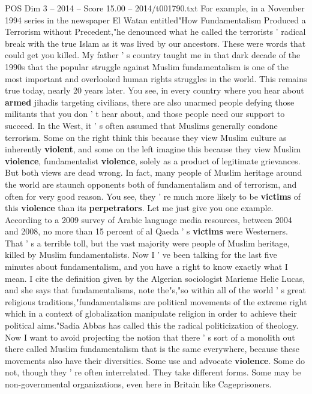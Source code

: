 \begin{textsample}{POS Dim 3 – 2014 – Score 15.00 – 2014/t001790.txt}
For example, in a November 1994 series in the newspaper El Watan entitled"How Fundamentalism Produced a Terrorism without Precedent,"he denounced what he called the terrorists ' radical break with the true Islam as it was lived by our ancestors.
These were words that could get you killed.
My father ' s country taught me in that dark decade of the 1990s that the popular struggle against Muslim fundamentalism is one of the most important and overlooked human rights struggles in the world.
This remains true today, nearly 20 years later.
You see, in every country where you hear about \textbf{armed} jihadis targeting civilians, there are also unarmed people defying those militants that you don ' t hear about, and those people need our support to succeed.
In the West, it ' s often assumed that Muslims generally condone terrorism.
Some on the right think this because they view Muslim culture as inherently \textbf{violent}, and some on the left imagine this because they view Muslim \textbf{violence}, fundamentalist \textbf{violence}, solely as a product of legitimate grievances.
But both views are dead wrong.
In fact, many people of Muslim heritage around the world are staunch opponents both of fundamentalism and of terrorism, and often for very good reason.
You see, they ' re much more likely to be \textbf{victims} of this \textbf{violence} than its \textbf{perpetrators}.
Let me just give you one example.
According to a 2009 survey of Arabic language media resources, between 2004 and 2008, no more than 15 percent of al Qaeda ' s \textbf{victims} were Westerners.
That ' s a terrible toll, but the vast majority were people of Muslim heritage, killed by Muslim fundamentalists.
Now I ' ve been talking for the last five minutes about fundamentalism, and you have a right to know exactly what I mean.
I cite the definition given by the Algerian sociologist Marieme Helie Lucas, and she says that fundamentalisms, note the"s,"so within all of the world ' s great religious traditions,"fundamentalisms are political movements of the extreme right which in a context of globalization manipulate religion in order to achieve their political aims."Sadia Abbas has called this the radical politicization of theology.
Now I want to avoid projecting the notion that there ' s sort of a monolith out there called Muslim fundamentalism that is the same everywhere, because these movements also have their diversities.
Some use and advocate \textbf{violence}.
Some do not, though they ' re often interrelated.
They take different forms.
Some may be non-governmental organizations, even here in Britain like Cageprisoners.

\end{textsample}

